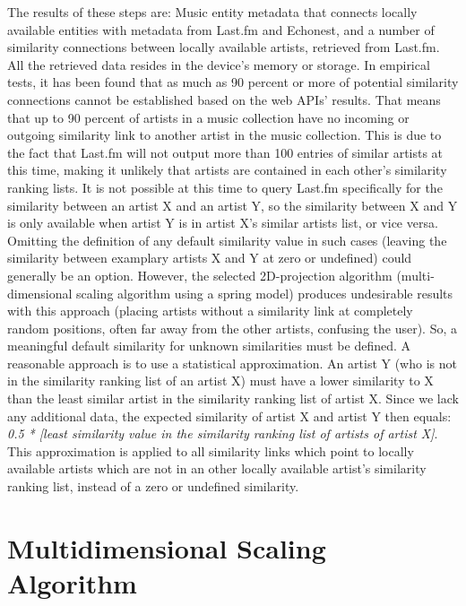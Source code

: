 The results of these steps are: Music entity metadata that connects locally available entities with metadata from Last.fm and Echonest, and a number of similarity connections between locally available artists, retrieved from Last.fm. All the retrieved data resides in the device's memory or storage. In empirical tests, it has been found that as much as 90 percent or more of potential similarity connections cannot be established based on the web APIs' results. That means that up to 90 percent of artists in a music collection have no incoming or outgoing similarity link to another artist in the music collection. This is due to the fact that Last.fm will not output more than 100 entries of similar artists at this time, making it unlikely that artists are contained in each other's similarity ranking lists. It is not possible at this time to query Last.fm specifically for the similarity between an artist X and an artist Y, so the similarity between X and Y is only available when artist Y is in artist X's similar artists list, or vice versa. 
Omitting the definition of any default similarity value in such cases (leaving the similarity between examplary artists X and Y at zero or undefined) could generally be an option. However, the selected 2D-projection algorithm (multi-dimensional scaling algorithm using a spring model) produces undesirable results with this approach (placing artists without a similarity link at completely random positions, often far away from the other artists, confusing the user).
So, a meaningful default similarity for unknown similarities must be defined. A reasonable approach is to use a statistical approximation. An artist Y (who is not in the similarity ranking list of an artist X) must have a lower similarity to X than the least similar artist in the similarity ranking list of artist X. Since we lack any additional data, the expected similarity of artist X and artist Y then equals:\\
\emph{0.5 * [least similarity value in the similarity ranking list of artists of artist X]}.\\
This approximation is applied to all similarity links which point to locally available artists which are not in an other locally available artist's similarity ranking list, instead of a zero or undefined similarity.

\section{Multidimensional Scaling Algorithm}
\label{sec:mds-algorithm}

